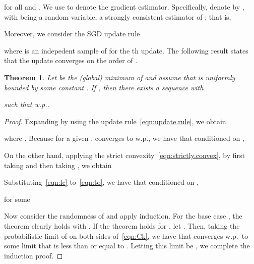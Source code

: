 \documentclass{article} \usepackage{iclr2018_conference,times}
\newcommand{\wpone}{w.p.}
\theoremstyle{plain}\newtheorem{theorem}{Theorem}\theoremstyle{plain}\newtheorem{proposition}[theorem]{Proposition}
\theoremstyle{plain}\newtheorem{corollary}[theorem]{Corollary}
\theoremstyle{plain}\newtheorem{lemma}[theorem]{Lemma}
\begin{document}
for all  and . We use  to denote the gradient estimator. Specifically, denote by , with  being a random variable, a strongly consistent estimator of ; that is,

Moreover, we consider the SGD update rule

where  is an indepedent sample of  for the th update. The following result states that the update converges on the order of .

\begin{theorem}
Let  be the \textup{(}global\textup{)} minimum of  and assume that  is uniformly bounded by some constant . If , then there exists a sequence  with

such that  \wpone.
\end{theorem}

\begin{proof}
Expanding  by using the update rule~\eqref{eqn:update.rule}, we obtain

where . Because for a given ,  converges to  \wpone, we have that conditioned on ,

On the other hand, applying the strict convexity~\eqref{eqn:strictly.convex}, by first taking  and then taking , we obtain

Substituting~\eqref{eqn:le} to~\eqref{eqn:to}, we have that conditioned on ,

for some

Now consider the randomness of  and apply induction. For the base case , the theorem clearly holds with . If the theorem holds for , let . Then, taking the probabilistic limit of  on both sides of~\eqref{eqn:Ck}, we have that  converges \wpone\ to some limit that is less than or equal to . Letting this limit be , we complete the induction proof.
\end{proof}
\end{document}

